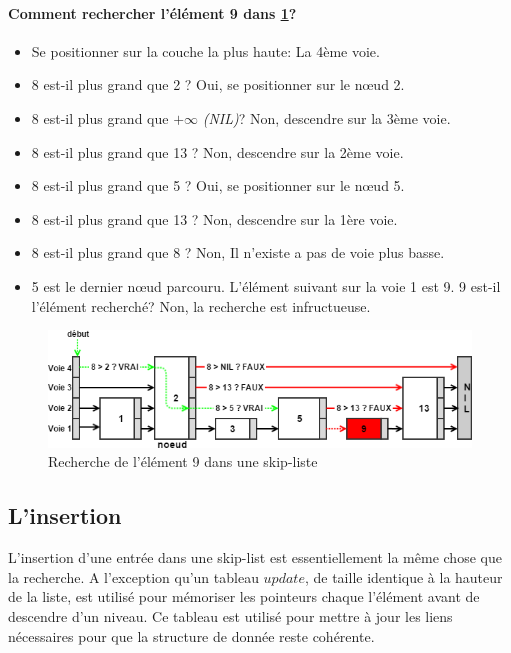 \documentclass[hidelinks,a4paper, 12pt]{article}
\begin{document}
	\newpage
	\paragraph*{Comment rechercher l'élément 9 dans \cref{SkipSearch2}?}
	
	\begin{itemize}
		\item Se positionner sur la couche la plus haute: La 4ème voie.
		\item 8 est-il plus grand que 2 ? Oui, se positionner sur le nœud 2.
		\item 8 est-il plus grand que $+\infty$ \textit{(NIL)}? Non, descendre sur la 3ème voie.
		\item 8 est-il plus grand que 13  ? Non, descendre sur la 2ème voie.
		\item 8 est-il plus grand que 5 ? Oui, se positionner sur le nœud 5.
		\item 8 est-il plus grand que 13 ? Non, descendre sur la 1ère voie.
		\item 8 est-il plus grand que 8 ? Non, Il n'existe a pas de voie plus basse.
		\item 5 est le dernier nœud parcouru. L'élément suivant sur la voie 1 est 9. 9 est-il l'élément recherché? Non, la recherche est infructueuse.
	\end{itemize}
	\begin{figure}[h]
		\includegraphics[width=\textwidth]{img/search2}
		\caption{Recherche de l'élément 9 dans une skip-liste}
		\label{SkipSearch2}
	\end{figure}
	
	
	\newpage
	\subsection{L'insertion}
	L'insertion d'une entrée dans une skip-list est essentiellement la même chose que la recherche. A l'exception qu'un tableau $update$, de taille identique à la hauteur de la liste, est utilisé pour mémoriser les pointeurs chaque l'élément avant de descendre d'un niveau. Ce tableau est utilisé pour mettre à jour les liens nécessaires pour que la structure de donnée reste cohérente.
	
\end{document}
